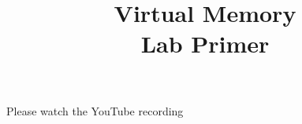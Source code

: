 

\title{Virtual Memory\\Lab Primer}



  \begin{frame}
    \titlepage
  \end{frame}

  \begin{slide}
    

    Please watch the YouTube recording

  \end{slide}


